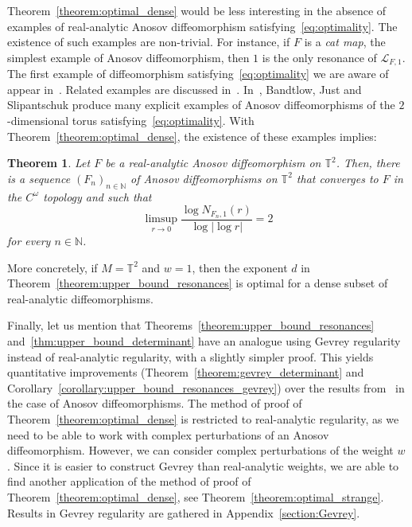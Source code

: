 \documentclass[10pt]{amsart}
\newtheorem{theo}{Theorem}[section]
\theoremstyle{definition}\newtheorem{defi}[theo]{Definition}\newtheorem{rema}[theo]{Remark}\newtheorem{exam}[theo]{Example}\newtheorem{exem}[theo]{Example}\newtheorem{nota}[theo]{Notation}
\newcommand{\va}[1]{\left|#1\right|}
\newcommand{\clL}{\mathcal{L}}
\newcommand{\bbT}{\mathbb{T}}
\newcommand{\bbN}{\mathbb{N}}
\begin{document}
Theorem~\ref{theorem:optimal_dense} would be less interesting in the absence of examples of real-analytic Anosov diffeomorphism satisfying~\eqref{eq:optimality}. The existence of such examples are non-trivial. For instance, if $F$ is a \emph{cat map}, the simplest example of Anosov diffeomorphism, then $1$ is the only resonance of $\clL_{F,1}$. The first example of diffeomorphism satisfying~\eqref{eq:optimality} we are aware of appear in~\cite{first_example}. Related examples are discussed in~\cite{other_example}. In~\cite{optimal_examples}, Bandtlow, Just and Slipantschuk produce many explicit examples of Anosov diffeomorphisms of the $2$-dimensional torus satisfying~\eqref{eq:optimality}. With Theorem~\ref{theorem:optimal_dense}, the existence of these examples implies:

\begin{theo}\label{theorem:optimality_torus}
Let $F$ be a real-analytic Anosov diffeomorphism on $\bbT^2$. Then, there is a sequence $(F_n)_{n \in \bbN}$ of Anosov diffeomorphisms on $\bbT^2$ that converges to $F$ in the $C^\omega$ topology and such that
\begin{equation*}
\limsup_{r \to 0} \frac{\log N_{F_n,1}(r)}{\log \va{\log r}} = 2
\end{equation*}
for every $n \in \bbN$.
\end{theo}

More concretely, if $M = \bbT^2$ and $w = 1$, then the exponent $d$ in Theorem~\ref{theorem:upper_bound_resonances} is optimal for a dense subset of real-analytic diffeomorphisms.

Finally, let us mention that Theorems~\ref{theorem:upper_bound_resonances} and~\ref{thm:upper_bound_determinant} have an analogue using Gevrey regularity instead of real-analytic regularity, with a slightly simpler proof. This yields quantitative improvements (Theorem~\ref{theorem:gevrey_determinant} and Corollary~\ref{corollary:upper_bound_resonances_gevrey}) over the results from~\cite[\S 2.2]{local_and_global} in the case of Anosov diffeomorphisms. The method of proof of Theorem~\ref{theorem:optimal_dense} is restricted to real-analytic regularity, as we need to be able to work with complex perturbations of an Anosov diffeomorphism. However, we can consider complex perturbations of the weight $w$. Since it is easier to construct Gevrey than real-analytic weights, we are able to find another application of the method of proof of Theorem~\ref{theorem:optimal_dense}, see Theorem~\ref{theorem:optimal_strange}. Results in Gevrey regularity are gathered in Appendix~\ref{section:Gevrey}.
\end{document}

